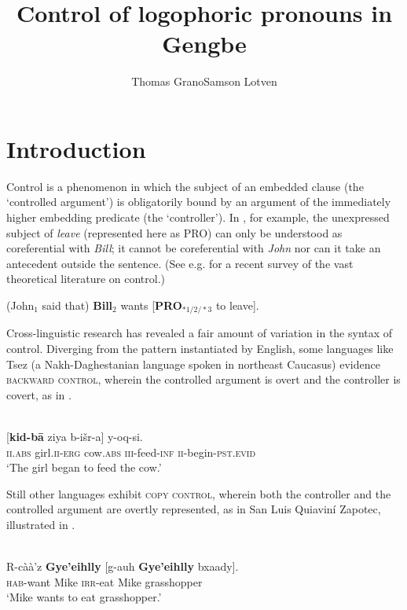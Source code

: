 \documentclass[output=paper,modfonts,nonflat]{langsci/langscibook}
\title{Control of logophoric pronouns in Gengbe}
\author{Thomas Grano\affiliation{Indiana University}\lastand Samson Lotven\affiliation{Indiana University} }
\begin{document}
\maketitle
\section{Introduction} 
\label{sec:Grano:Introduction:1}

Control is a phenomenon in which the subject of an embedded clause (the `controlled argument') is obligatorily bound by an argument of the immediately higher embedding predicate (the `controller'). In , for example, the unexpressed subject of \emph{leave} (represented here as PRO) can only be understood as coreferential with \emph{Bill}; it cannot be coreferential with \emph{John} nor can it take an antecedent outside the sentence. (See e.g. \citealt{Landau2013} for a recent survey of the vast theoretical literature on control.)

\ea (John$_{1}$ said that) {\textbf{Bill}$_{2}$} wants [{\textbf{PRO}}$_{*1/2/*3}$ to leave]. \label{ex:grano:1}
\z

Cross-linguistic research has revealed a fair amount of variation in the syntax of control. Diverging from the pattern instantiated by English, some languages like Tsez (a Nakh-Daghestanian language spoken in northeast Caucasus) evidence \textsc{backward control}, wherein the controlled argument is overt and the controller is covert, as in .

\ea \label{ex:grano:2}
\\
\gll {\textbf{$\emptyset$}} [\textbf{kid-b\={a}} ziya b-i\v{s}r-a] y-oq-si.\\
\textsc{ii}.\textsc{abs} girl.\textsc{ii}-\textsc{erg} cow.\textsc{abs} \textsc{iii}-feed-\textsc{inf} \textsc{ii}-begin-\textsc{pst}.\textsc{evid}\\
\glt `The girl began to feed the cow.'
\z

Still other languages exhibit \textsc{copy control}, wherein both the controller and the controlled argument are overtly represented, as in San Luis Quiavin\'i Zapotec, illustrated in .

\ea \label{ex:grano:3}
\\
\gll R-c\`a\`a'z \textbf{Gye'eihlly} [g-auh \textbf{Gye'eihlly} bxaady].\\
\textsc{hab}-want Mike \textsc{irr}-eat Mike grasshopper\\
\glt `Mike wants to eat grasshopper.' \\
\z
\end{document}
